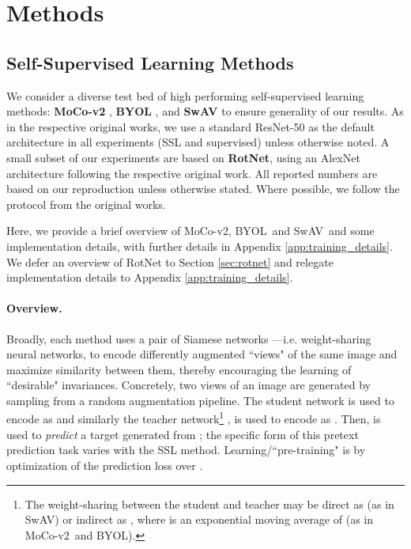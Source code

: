 \documentclass[twoside,11pt]{article}
\newcommand{\moco}{MoCo-v2}
\newcommand{\byol}{BYOL}
\newcommand{\swav}{SwAV}
\begin{document}
 \section{Methods} \label{sec:methods}


\subsection{Self-Supervised Learning Methods}
We consider a diverse test bed of high performing self-supervised learning methods: \textbf{\moco} \citep{chen2020mocov2}, \textbf{BYOL} \citep{grill2020bootstrap}, and \textbf{SwAV} \citep{swav} to ensure generality of our results. As in the respective original works, we use a standard ResNet-50 \citep{resnet} as the default architecture in all experiments (SSL and supervised) unless otherwise noted. A small subset of our experiments are based on \textbf{RotNet}\citep{gidaris2018unsupervised}, using an AlexNet \citep{alexnet} architecture following the respective original work. All reported numbers are based on our reproduction unless otherwise stated. Where possible, we follow the protocol from the original works.

Here, we provide a brief overview of \moco, \byol~and \swav~and some implementation details, with further details in Appendix \ref{app:training_details}. We defer an overview of RotNet to Section \ref{sec:rotnet} and relegate implementation details to Appendix \ref{app:training_details}.

\paragraph{Overview.} Broadly, each method uses a pair of Siamese networks \citep{siamese_bromley_1994}---i.e. weight-sharing neural networks, to encode differently augmented ``views" of the same image and maximize similarity between them, thereby encouraging the learning of ``desirable" invariances. Concretely, two views  of an image  are generated by sampling from a random augmentation pipeline. The student network  is used to encode  as  and similarly the teacher network\footnote{The weight-sharing between the student and teacher may be direct as  (as in SwAV) or indirect as , where  is an exponential moving average of  (as in \moco~and BYOL).} , is used to encode  as . Then,  is used to \textit{predict} a target generated from ; the specific form of this   pretext prediction task varies with the SSL method. Learning/``pre-training" is by optimization of the prediction loss over .
\end{document}
